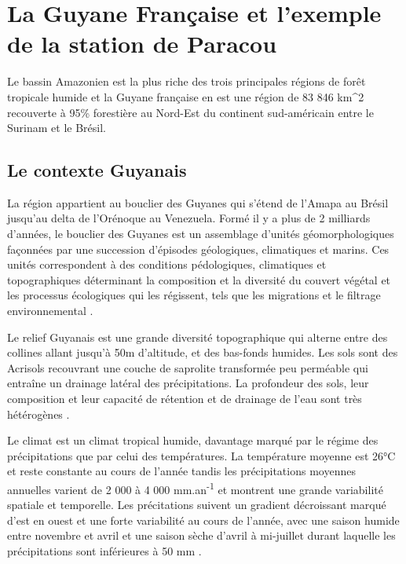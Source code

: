 \documentclass[
  11pt,
  french,
  A4paper,
  extrafontsizes,onecolumn,openright
  ]{memoir}
\begin{document}
\section{La Guyane Française et l'exemple de la station de
Paracou}\label{la-guyane-francaise-et-lexemple-de-la-station-de-paracou}

Le bassin Amazonien est la plus riche des trois principales régions de
forêt tropicale humide \autocite{Gentry1988} et la Guyane française en
est une région de 83 846 km\^{}2 recouverte à 95\% forestière au
Nord-Est du continent sud-américain entre le Surinam et le Brésil.

\subsection{Le contexte Guyanais}\label{le-contexte-guyanais}

La région appartient au bouclier des Guyanes qui s'étend de l'Amapa au
Brésil jusqu'au delta de l'Orénoque au Venezuela. Formé il y a plus de 2
milliards d'années, le bouclier des Guyanes est un assemblage d'unités
géomorphologiques façonnées par une succession d'épisodes géologiques,
climatiques et marins. Ces unités correspondent à des conditions
pédologiques, climatiques et topographiques déterminant la composition
et la diversité du couvert végétal et les processus écologiques qui les
régissent, tels que les migrations et le filtrage environnemental
\autocite{Guitet2015}.

Le relief Guyanais est une grande diversité topographique qui alterne
entre des collines allant jusqu'à 50m d'altitude, et des bas-fonds
humides. Les sols sont des Acrisols recouvrant une couche de saprolite
transformée peu perméable qui entraîne un drainage latéral des
précipitations. La profondeur des sols, leur composition et leur
capacité de rétention et de drainage de l'eau sont très hétérogènes
\autocites{Ferry2010}{Robert2003}.

Le climat est un climat tropical humide, davantage marqué par le régime
des précipitations que par celui des températures. La température
moyenne est 26°C et reste constante au cours de l'année tandis les
précipitations moyennes annuelles varient de 2 000 à 4 000
mm.an\textsuperscript{-1} et montrent une grande variabilité spatiale et
temporelle. Les précitations suivent un gradient décroissant marqué
d'est en ouest et une forte variabilité au cours de l'année, avec une
saison humide entre novembre et avril et une saison sèche d'avril à
mi-juillet durant laquelle les précipitations sont inférieures à 50 mm
\autocite{Wagner2011}.
\end{document}

